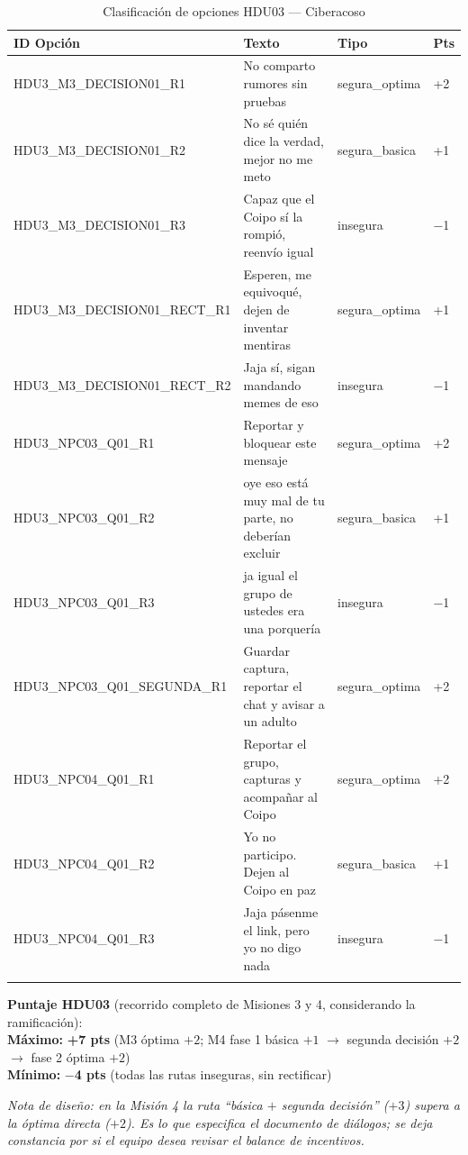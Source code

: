 \documentclass[12pt,a4paper]{article}
\begin{document}
\begin{longtable}{llll}
\toprule
\textbf{ID Opción} & \textbf{Texto} & \textbf{Tipo} & \textbf{Pts} \\
\midrule
\endhead
HDU3\_M3\_DECISION01\_R1 & No comparto rumores sin pruebas & segura\_optima & +2 \\
HDU3\_M3\_DECISION01\_R2 & No sé quién dice la verdad, mejor no me meto & segura\_basica & +1 \\
HDU3\_M3\_DECISION01\_R3 & Capaz que el Coipo sí la rompió, reenvío igual & insegura & $-$1 \\
\midrule
HDU3\_M3\_DECISION01\_RECT\_R1 & Esperen, me equivoqué, dejen de inventar mentiras & segura\_optima & +1 \\
HDU3\_M3\_DECISION01\_RECT\_R2 & Jaja sí, sigan mandando memes de eso & insegura & $-$1 \\
\midrule
HDU3\_NPC03\_Q01\_R1 & Reportar y bloquear este mensaje & segura\_optima & +2 \\
HDU3\_NPC03\_Q01\_R2 & oye eso está muy mal de tu parte, no deberían excluir & segura\_basica & +1 \\
HDU3\_NPC03\_Q01\_R3 & ja igual el grupo de ustedes era una porquería & insegura & $-$1 \\
\midrule
HDU3\_NPC03\_Q01\_SEGUNDA\_R1 & Guardar captura, reportar el chat y avisar a un adulto & segura\_optima & +2 \\
\midrule
HDU3\_NPC04\_Q01\_R1 & Reportar el grupo, capturas y acompañar al Coipo & segura\_optima & +2 \\
HDU3\_NPC04\_Q01\_R2 & Yo no participo. Dejen al Coipo en paz & segura\_basica & +1 \\
HDU3\_NPC04\_Q01\_R3 & Jaja pásenme el link, pero yo no digo nada & insegura & $-$1 \\
\bottomrule
\caption{Clasificación de opciones HDU03 --- Ciberacoso}
\end{longtable}

\vspace{1em}
\textbf{Puntaje HDU03} (recorrido completo de Misiones 3 y 4, considerando la ramificación):\\
\textbf{Máximo:} \textbf{+7 pts} (M3 óptima $+2$; M4 fase 1 básica $+1$ $\rightarrow$ segunda decisión $+2$ $\rightarrow$ fase 2 óptima $+2$)\\
\textbf{Mínimo:} \textbf{$-$4 pts} (todas las rutas inseguras, sin rectificar)

\medskip
\noindent\footnotesize\textit{Nota de diseño: en la Misión 4 la ruta ``básica $+$ segunda decisión'' ($+3$) supera a la
óptima directa ($+2$). Es lo que especifica el documento de diálogos; se deja constancia por si el
equipo desea revisar el balance de incentivos.}\normalsize
\end{document}
